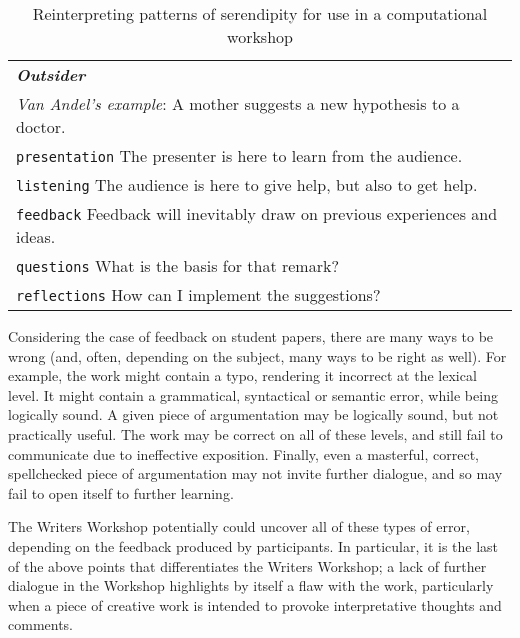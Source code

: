 \begin{table}[p]
\begin{tabular}{p{}}
{\bf\emph{Outsider}}  \\
\emph{Van Andel's example}:  A mother suggests a new hypothesis to a doctor. \\[.2cm]
{\tt presentation} The presenter is here to learn from the audience. \\
{\tt listening}   The audience is here to give help, but also to get help.\\
{\tt feedback}     Feedback will inevitably draw on previous experiences and ideas.\\
{\tt questions}    What is the basis for that remark?\\
{\tt reflections}  How can I implement the suggestions?\\
\end{tabular}
\vspace{.2cm}
\caption{Reinterpreting patterns of serendipity for use in a computational workshop\label{tab:reinterpret}}
\end{table}


\bigskip

Considering the case of feedback on student papers, there are many ways to be wrong (and, often, depending on the subject, many ways to be right as well).  
For example, the work might contain a typo, rendering it incorrect at the lexical level.  It might contain a grammatical, syntactical or semantic error, while being logically sound.  A given piece of argumentation may be logically sound, but not practically useful.   The work may be correct on all of these levels, and still fail to communicate due to ineffective exposition.  Finally, even a masterful, correct, spellchecked piece of argumentation may not invite further dialogue, and so may fail to open itself to further learning.

The Writers Workshop potentially could uncover all of these types of error, depending on the feedback produced by participants. In particular, it is the last of the above points that differentiates the Writers Workshop; a lack of further dialogue in the Workshop highlights by itself a flaw with the work, particularly when a piece of creative work is intended to provoke interpretative thoughts and comments. 


